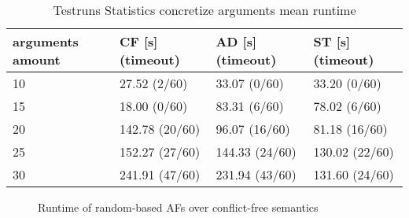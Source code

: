 \begin{table}[H]
    \centering
    \caption{Testruns Statistics concretize arguments mean runtime}
    \begin{tabular}{ |l|l|l|l| }
        \hline
            arguments amount & CF [s] (timeout)& AD [s] (timeout)& ST [s] (timeout)\\
        \hline
            10 & 27.52 \hfill (2/60) & 33.07 \hfill (0/60) & 33.20 \hfill (0/60) \\
            15 & 18.00 \hfill (0/60) & 83.31 \hfill (6/60) & 78.02 \hfill (6/60) \\
            20 & 142.78 \hfill (20/60) & 96.07 \hfill (16/60) & 81.18 \hfill (16/60) \\
            25 & 152.27 \hfill (27/60) & 144.33 \hfill (24/60) & 130.02 \hfill (22/60) \\
            30 & 241.91 \hfill (47/60) & 231.94 \hfill (43/60) & 131.60 \hfill (24/60) \\
        \hline
    \end{tabular}
\label{table:ExperimentStatisticsConcretize}
\end{table}


\begin{figure}[H]
    \centering
    \caption{Runtime of random-based AFs over conflict-free semantics}
    \label{fig:expconcretize/BFSvsDFS/random/CF}
\end{figure}


